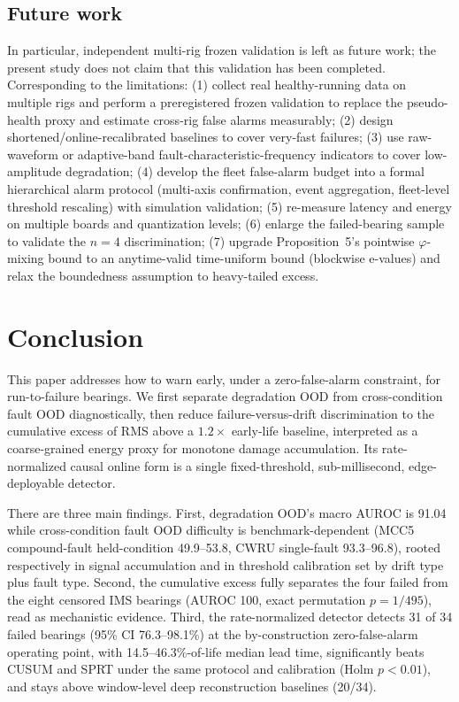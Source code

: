 \documentclass[journal]{IEEEtran}
\begin{document}
\subsection{Future work}
In particular, independent multi-rig frozen validation is left as future work; the present study does not claim that this validation has been completed. Corresponding to the limitations: (1) collect real healthy-running data on multiple rigs and perform a preregistered frozen validation to replace the pseudo-health proxy and estimate cross-rig false alarms measurably; (2) design shortened/online-recalibrated baselines to cover very-fast failures; (3) use raw-waveform or adaptive-band fault-characteristic-frequency indicators to cover low-amplitude degradation; (4) develop the fleet false-alarm budget into a formal hierarchical alarm protocol (multi-axis confirmation, event aggregation, fleet-level threshold rescaling) with simulation validation; (5) re-measure latency and energy on multiple boards and quantization levels; (6) enlarge the failed-bearing sample to validate the $n=4$ discrimination; (7) upgrade Proposition~5's pointwise $\varphi$-mixing bound to an anytime-valid time-uniform bound (blockwise e-values) and relax the boundedness assumption to heavy-tailed excess.

\section{Conclusion}\label{sec:conclusion}
This paper addresses how to warn early, under a zero-false-alarm constraint, for run-to-failure bearings. We first separate degradation OOD from cross-condition fault OOD diagnostically, then reduce failure-versus-drift discrimination to the cumulative excess of RMS above a $1.2\times$ early-life baseline, interpreted as a coarse-grained energy proxy for monotone damage accumulation. Its rate-normalized causal online form is a single fixed-threshold, sub-millisecond, edge-deployable detector.

There are three main findings. First, degradation OOD's macro AUROC is 91.04 while cross-condition fault OOD difficulty is benchmark-dependent (MCC5 compound-fault held-condition 49.9--53.8, CWRU single-fault 93.3--96.8), rooted respectively in signal accumulation and in threshold calibration set by drift type plus fault type. Second, the cumulative excess fully separates the four failed from the eight censored IMS bearings (AUROC 100, exact permutation $p=1/495$), read as mechanistic evidence. Third, the rate-normalized detector detects 31 of 34 failed bearings (95\% CI 76.3--98.1\%) at the by-construction zero-false-alarm operating point, with 14.5--46.3\%-of-life median lead time, significantly beats CUSUM and SPRT under the same protocol and calibration (Holm $p<0.01$), and stays above window-level deep reconstruction baselines (20/34).
\end{document}
